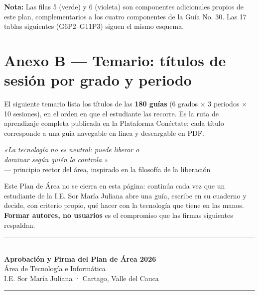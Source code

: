 \documentclass[12pt, a4paper]{article}
\begin{document}
\begin{landscape}
\medskip
\noindent\textbf{Nota:} Las filas 5 (\textcolor{verdePC}{verde}) y 6 (\textcolor{moradoSEL}{violeta})
son componentes adicionales propios de este plan, complementarios a los cuatro
componentes de la Guía No. 30. Las 17 tablas siguientes (G6P2–G11P3) siguen el
mismo esquema.



\clearpage
\end{landscape}

\clearpage
\section{Anexo B — Temario: títulos de sesión por grado y periodo}

\noindent El siguiente temario lista los títulos de las \textbf{180 guías}
(6 grados $\times$ 3 periodos $\times$ 10 sesiones), en el orden en que el
estudiante las recorre. Es la ruta de aprendizaje completa publicada en la
Plataforma Conéctate; cada título corresponde a una guía navegable en línea y
descargable en PDF.



\newpage
\thispagestyle{empty}

\vspace*{1.2cm}
\begin{center}
{\large\itshape\color{vinoInst}«La tecnología no es neutral: puede liberar o\\
dominar según quién la controla.»}\\[0.25cm]
{\footnotesize\color{vinoInst}— principio rector del área, inspirado en la filosofía de la liberación}
\end{center}

\vspace{0.9cm}
\noindent Este Plan de Área no se cierra en esta página: continúa cada vez que un
estudiante de la I.E. Sor María Juliana abre una guía, escribe en su cuaderno y
decide, con criterio propio, qué hacer con la tecnología que tiene en las manos.
\textbf{Formar autores, no usuarios} es el compromiso que las firmas siguientes
respaldan.

\vspace{1.1cm}
\begin{center}
{\color{vinoInst}\rule{\linewidth}{2pt}}\\[0.6cm]
{\Large\bfseries\color{vinoInst}Aprobación y Firma del Plan de Área 2026}\\[0.3cm]
{\normalsize Área de Tecnología e Informática}\\[0.1cm]
{\normalsize I.E. Sor María Juliana · Cartago, Valle del Cauca}\\[0.3cm]
{\color{vinoInst}\rule{\linewidth}{0.5pt}}
\end{center}
\end{document}
